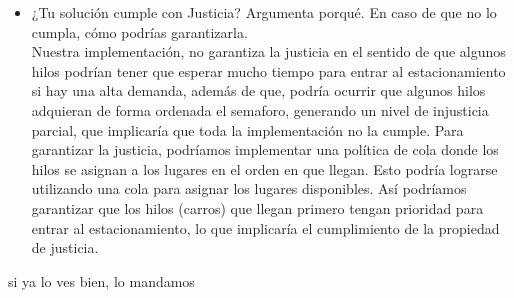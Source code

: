 \documentclass[10pt,letterpaper]{article}
\begin{document}
\begin{itemize}
        \item ¿Tu solución cumple con Justicia? Argumenta porqué. En caso de que no lo cumpla, cómo podrías garantizarla.\\
        Nuestra implementación, no garantiza la justicia en el sentido de que algunos hilos podrían tener que esperar mucho tiempo para entrar al estacionamiento si hay una alta demanda, además de que, podría ocurrir que algunos hilos adquieran de forma ordenada el semaforo, generando un nivel de injusticia parcial, que implicaría que toda la implementación no la cumple. Para garantizar la justicia, podríamos implementar una política de cola donde los hilos se asignan a los lugares en el orden en que llegan. Esto podría lograrse utilizando una cola para asignar los lugares disponibles. Así podríamos garantizar que los hilos (carros) que llegan primero tengan prioridad para entrar al estacionamiento, lo que implicaría el cumplimiento de la propiedad de justicia.
    \end{itemize}
si ya lo ves bien, lo mandamos
\end{document}
